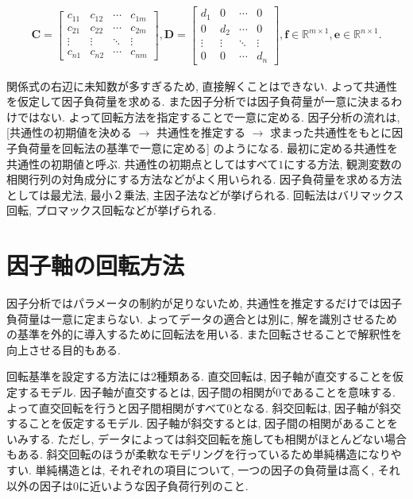 \documentclass[dvipdfmx, 10pt]{jsarticle}
\begin{document}
\begin{align*}
    \mathbf{C} = 
    \begin{bmatrix}
    c_{11} & c_{12} & \cdots & c_{1m} \\
    c_{21} & c_{22} & \cdots & c_{2m} \\
    \vdots & \vdots & \ddots & \vdots \\
    c_{n1} & c_{n2} & \cdots & c_{nm}
    \end{bmatrix}, 
    \mathbf{D} = 
    \begin{bmatrix}
    d_{1} & 0 & \cdots & 0 \\
    0 & d_{2} & \cdots & 0 \\
    \vdots & \vdots & \ddots & \vdots \\
    0 & 0 & \cdots & d_n
    \end{bmatrix}, 
    \mathbf{f} \in \mathbb{R}^{m \times 1}, 
    \mathbf{e} \in \mathbb{R}^{n \times 1}. 
\end{align*}

関係式の右辺に未知数が多すぎるため, 直接解くことはできない. よって共通性を仮定して因子負荷量を求める. 
また因子分析では因子負荷量が一意に決まるわけではない. よって回転方法を指定することで一意に定める. 
因子分析の流れは, [共通性の初期値を決める \(\rightarrow\) 共通性を推定する \(\rightarrow\) 
求まった共通性をもとに因子負荷量を回転法の基準で一意に定める] のようになる.  
最初に定める共通性を共通性の初期値と呼ぶ. 
共通性の初期点としてはすべて\(1\)にする方法, 観測変数の相関行列の対角成分にする方法などがよく用いられる. 
因子負荷量を求める方法としては最尤法, 最小２乗法, 主因子法などが挙げられる. 
回転法はバリマックス回転, プロマックス回転などが挙げられる. 

\section*{因子軸の回転方法}
因子分析ではパラメータの制約が足りないため, 共通性を推定するだけでは因子負荷量は一意に定まらない. 
よってデータの適合とは別に, 解を識別させるための基準を外的に導入するために回転法を用いる. 
また回転させることで解釈性を向上させる目的もある. 

回転基準を設定する方法には2種類ある. 直交回転は, 因子軸が直交することを仮定するモデル. 
因子軸が直交するとは, 因子間の相関が0であることを意味する. よって直交回転を行うと因子間相関がすべて0となる. 
斜交回転は, 因子軸が斜交することを仮定するモデル. 因子軸が斜交するとは, 因子間の相関があることをいみする. 
ただし, データによっては斜交回転を施しても相関がほとんどない場合もある. 
斜交回転のほうが柔軟なモデリングを行っているため単純構造になりやすい.
単純構造とは, それぞれの項目について, 一つの因子の負荷量は高く, それ以外の因子は0に近いような因子負荷行列のこと. 
\end{document}
